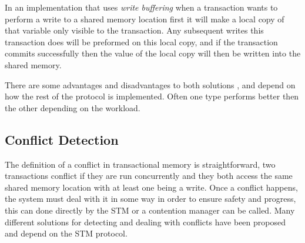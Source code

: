 In an implementation that uses \emph{write buffering} \cite{}
when a transaction wants to perform
 a write to a shared memory location first it will make a local copy of that variable only visible to the transaction.
Any subsequent writes this transaction does will be preformed on this local copy,
 and if the transaction commits successfully then the value of the local copy will then be written into the shared memory.

There are some advantages and disadvantages to both solutions \cite{1123001}, and depend on how the rest of the 
protocol is implemented.
Often one type performs better then the other depending on the workload.



\subsection{Conflict Detection}
The definition of a conflict in transactional memory is straightforward, two 
transactions conflict if they are run concurrently and they both access the same 
shared memory location with at least one being a write.
Once a conflict happens, the system must deal with it in some way in order to ensure
safety and progress, this can done directly by the STM or a contention manager \cite{HLMS03} can be called.
Many different solutions for detecting and dealing with conflicts have been proposed and depend
on the STM protocol.

